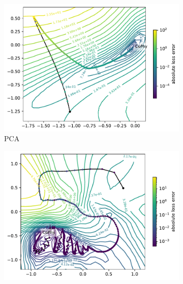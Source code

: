 \documentclass[letterpaper]{article} %
\begin{document}
        \begin{figure}[htbp]
              \centering
              \begin{subfigure}[b]{0.3\textwidth}
                \includegraphics[width=\textwidth]{figures/round3/Cophy_PCA/directions.h5_proj_cos_phy_total.h5_total_phy_abs_error_2dcontour_proj.pdf}
                \caption{PCA}
                \label{fig:PCAvsAE2_PCAlosses}
              \end{subfigure}
              \begin{subfigure}[b]{0.3\textwidth}
                \includegraphics[width=\textwidth]{figures/round3/Cophy_NV/map_phy_total_abs_error.pdf}
                \caption{\proposedautencoder{}}
                \label{fig:PCAvsAE2_losses}

\end{subfigure}
\end{figure}
\end{document}
